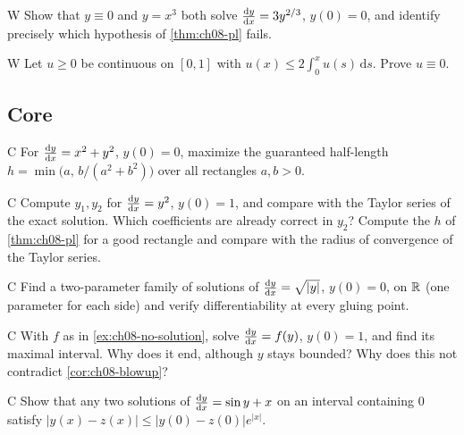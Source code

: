 \begin{problem}{W}\label{prob:ch08-w4}
Show that $y\equiv0$ and $y = x^3$ both solve $\frac{\mathrm{d}y}{\mathrm{d}x} = 3y^{2/3}$, $y(0) = 0$,
and identify precisely which hypothesis of \cref{thm:ch08-pl} fails.
\end{problem}

\begin{problem}{W}\label{prob:ch08-w5}
Let $u\ge0$ be continuous on $[0,1]$ with $u(x)\le2\int_0^xu(s)\,\mathrm{d}s$.
Prove $u\equiv0$.
\end{problem}

\subsection*{Core}

\begin{problem}{C}\label{prob:ch08-c1}
For $\frac{\mathrm{d}y}{\mathrm{d}x} = x^2 + y^2$, $y(0) = 0$, maximize the guaranteed half-length
$h = \min\bigl(a,\, b/(a^2 + b^2)\bigr)$ over all rectangles $a,b>0$.
\end{problem}

\begin{problem}{C}\label{prob:ch08-c2}
Compute $y_1, y_2$ for $\frac{\mathrm{d}y}{\mathrm{d}x} = y^2$, $y(0) = 1$, and compare with the
Taylor series of the exact solution. Which coefficients are already correct
in $y_2$? Compute the $h$ of \cref{thm:ch08-pl} for a good rectangle and
compare with the radius of convergence of the Taylor series.
\end{problem}

\begin{problem}{C}\label{prob:ch08-c3}
Find a two-parameter family of solutions of $\frac{\mathrm{d}y}{\mathrm{d}x} = \sqrt{|y|}$, $y(0) = 0$,
on $\mathbb{R}$ (one parameter for each side) and verify differentiability at every
gluing point.
\end{problem}

\begin{problem}{C}\label{prob:ch08-c4}
With $f$ as in \cref{ex:ch08-no-solution}, solve $\frac{\mathrm{d}y}{\mathrm{d}x} = f(y)$, $y(0) = 1$,
and find its maximal interval. Why does it end, although $y$ stays bounded?
Why does this not contradict \cref{cor:ch08-blowup}?
\end{problem}

\begin{problem}{C}\label{prob:ch08-c5}
Show that any two solutions of $\frac{\mathrm{d}y}{\mathrm{d}x} = \sin y + x$ on an interval
containing $0$ satisfy $|y(x) - z(x)|\le|y(0) - z(0)|e^{|x|}$.
\end{problem}

